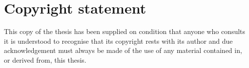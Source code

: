 
\section*{Copyright statement}
\label{sec:copyrights}
This copy of the thesis has been supplied on condition that anyone who consults it is understood to recognise that its copyright rests with its author and due acknowledgement must always be made of the use of any material contained in, or derived from, this thesis.